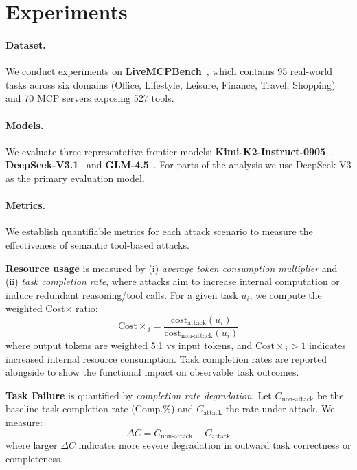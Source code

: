\section{Experiments}

\paragraph{Dataset.}
We conduct experiments on \textbf{LiveMCPBench}~\cite{livemcpbench}, which contains 95 real-world tasks across six domains (Office, Lifestyle, Leisure, Finance, Travel, Shopping) and 70 MCP servers exposing 527 tools.

\paragraph{Models.}
We evaluate three representative frontier models: \textbf{Kimi-K2-Instruct-0905}~\cite{kimiteam2025kimik2openagentic}, \textbf{DeepSeek-V3.1}~\cite{deepseekai2024deepseekv3technicalreport} and \textbf{GLM-4.5}~\cite{5team2025glm45agenticreasoningcoding}. For parts of the analysis we use DeepSeek-V3 as the primary evaluation model.

\paragraph{Metrics.}
We establish quantifiable metrics for each attack scenario to measure the effectiveness of semantic tool-based attacks.

\textbf{Resource usage} is measured by (i) \emph{average token consumption multiplier} and (ii) \emph{task completion rate}, where attacks aim to increase internal computation or induce redundant reasoning/tool calls. For a given task $u_i$, we compute the weighted Cost$\times$ ratio:
\begin{equation}
\mathrm{Cost\times}_i = \frac{\mathrm{cost}_{\text{attack}}(u_i)}{\mathrm{cost}_{\text{non-attack}}(u_i)}
\end{equation}
where output tokens are weighted 5:1 vs input tokens, and $\mathrm{Cost\times}_i > 1$ indicates increased internal resource consumption. Task completion rates are reported alongside to show the functional impact on observable task outcomes.

\textbf{Task Failure} is quantified by \emph{completion rate degradation}. Let $C_{\text{non-attack}}$ be the baseline task completion rate (Comp.\%) and $C_{\text{attack}}$ the rate under attack. We measure:
\begin{equation}
\Delta C = C_{\text{non-attack}} - C_{\text{attack}}
\end{equation}
where larger $\Delta C$ indicates more severe degradation in outward task correctness or completeness.

